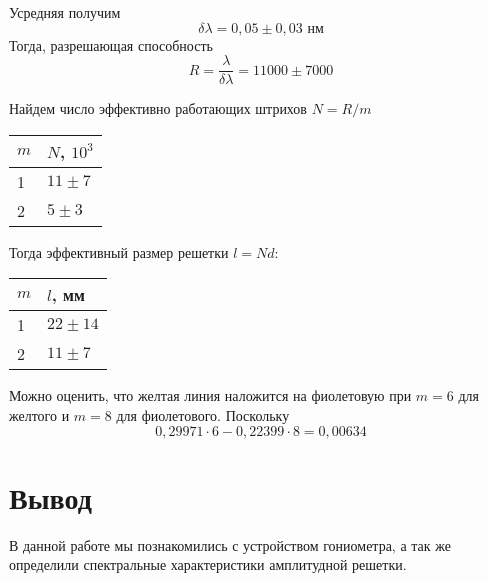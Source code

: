 	Усредняя получим
	\[
		\delta\lambda = 0,05\pm0,03 \text{ нм}
	\]
	Тогда, разрешающая способность 
	\[
		R = \frac{\lambda}{\delta\lambda} = 11000\pm7000
	\]
	
	Найдем число эффективно работающих штрихов $N = R/m$
	\begin{table}[H]
		\centering
		\begin{tabular}{|l|l|}
			\hline
			$m$ & $N$, $10^3$ \\ \hline
			1   & $11\pm7$    \\ \hline
			2   & $5\pm3$     \\ \hline
		\end{tabular}
	\end{table}

	Тогда эффективный размер решетки $l = Nd$:
	\begin{table}[H]
		\centering
		\begin{tabular}{|l|l|}
			\hline
			$m$ & $l$, мм   \\ \hline
			1   & $22\pm14$ \\ \hline
			2   & $11\pm7$  \\ \hline
		\end{tabular}
	\end{table}

	Можно оценить, что желтая линия наложится на фиолетовую при $m=6$ для желтого и $m =8$ для фиолетового. Поскольку
	\[
		0,29971\cdot6-0,22399\cdot8 = 0,00634
	\]
	
	\section{Вывод}
	В данной работе мы познакомились с устройством гониометра, а так же определили спектральные характеристики амплитудной решетки.
	
	


